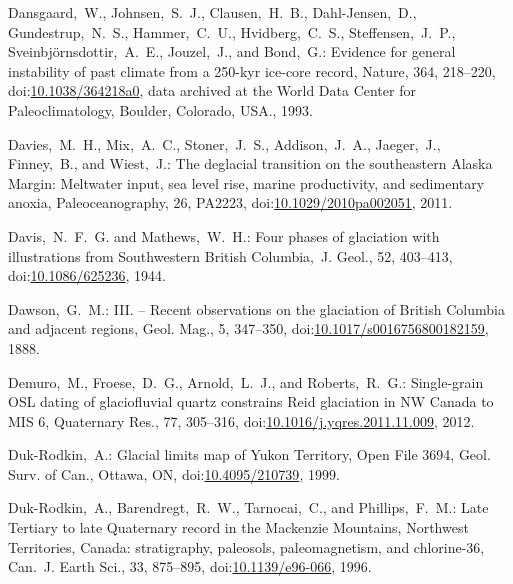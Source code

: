 \documentclass[tc, manuscript]{copernicus}
\begin{document}
\begin{thebibliography}{114}
Dansgaard,~W., Johnsen,~S.~J., Clausen,~H.~B., Dahl-Jensen,~D., Gundestrup,~N.~S., Hammer,~C.~U., Hvidberg,~C.~S., Steffensen,~J.~P., Sveinbj\"ornsdottir,~A.~E., Jouzel,~J., and Bond,~G.: Evidence for general instability of past climate from a 250-kyr ice-core record, Nature, 364, 218--220,
doi:\href{http://dx.doi.org/10.1038/364218a0}{10.1038/364218a0}, data archived at the World Data Center for Paleoclimatology, Boulder, Colorado, USA., 1993.


Davies,~M.~H., Mix,~A.~C., Stoner,~J.~S., Addison,~J.~A., Jaeger,~J., Finney,~B., and Wiest,~J.: The deglacial transition on the southeastern Alaska Margin: Meltwater input, sea level rise, marine productivity, and sedimentary anoxia, Paleoceanography, 26, PA2223,
doi:\href{http://dx.doi.org/10.1029/2010pa002051}{10.1029/2010pa002051}, 2011.


Davis,~N.~F.~G. and Mathews,~W.~H.: Four phases of glaciation with illustrations from Southwestern British Columbia,~J. Geol., 52, 403--413,
doi:\href{http://dx.doi.org/10.1086/625236}{10.1086/625236}, 1944.


Dawson,~G.~M.: III. -- Recent observations on the glaciation of British Columbia and adjacent regions, Geol. Mag., 5, 347--350,
doi:\href{http://dx.doi.org/10.1017/s0016756800182159}{10.1017/s0016756800182159}, 1888.


Demuro,~M., Froese,~D.~G., Arnold,~L.~J., and Roberts,~R.~G.: Single-grain OSL dating of glaciofluvial quartz constrains Reid glaciation in NW Canada to MIS 6, Quaternary Res., 77, 305--316,
doi:\href{http://dx.doi.org/10.1016/j.yqres.2011.11.009}{10.1016/j.yqres.2011.11.009}, 2012.


Duk-Rodkin,~A.: Glacial limits map of Yukon Territory, Open File 3694, Geol. Surv. of Can., Ottawa, ON,
doi:\href{http://dx.doi.org/10.4095/210739}{10.4095/210739}, 1999.


Duk-Rodkin,~A., Barendregt,~R.~W., Tarnocai,~C., and Phillips,~F.~M.: Late Tertiary to late Quaternary record in the Mackenzie Mountains, Northwest Territories, Canada: stratigraphy, paleosols, paleomagnetism, and chlorine-36, Can.~J. Earth Sci., 33, 875--895,
doi:\href{http://dx.doi.org/10.1139/e96-066}{10.1139/e96-066}, 1996.



\end{thebibliography}
\end{document}
